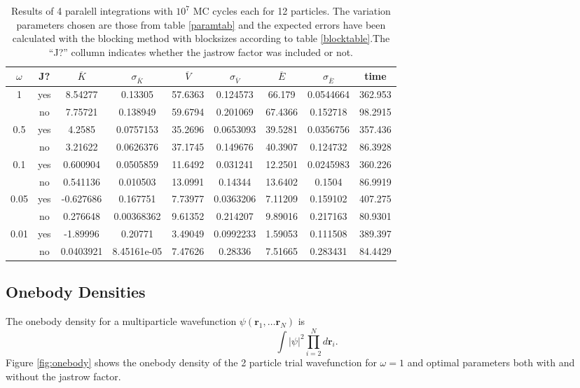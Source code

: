 \documentclass[a4paper,English,10pt]{article}
\newcommand{\bb}[1]{\boldsymbol{#1}}
\newcommand{\be}{\begin{equation}}
\newcommand{\ee}{\end{equation}}
\renewcommand{\bar}{\overline}
\begin{document}
\begin{table}
  \centering
    \caption[Results 12 particles]{Results of 4 paralell integrations with $10^7$ MC cycles each for 12 particles.
    The variation parameters chosen are those from table \ref{paramtab} and the expected errors have been calculated with the blocking method with blocksizes
    according to table \ref{blocktable}.The ``J?'' collumn indicates whether the jastrow factor was included or not.}
  \label{Etab12}
  \begin{tabular}{*{9}c}
    \toprule
     $\omega$ &J?& $\bar{K}$ & $\sigma_{\bar{K}}$& $\bar{V}$& $\sigma_{\bar{V}}$& $\bar{E}$  & $\sigma_{\bar{E}}$  &time\\
    \midrule
    1 &yes&8.54277&	0.13305	&57.6363	&0.124573&	66.179&	0.0544664 & 362.953\\
    &no &7.75721	&0.138949	&59.6794	&0.201069	&67.4366	&0.152718 &98.2915\\
    0.5 &yes&4.2585	&0.0757153	&35.2696	&0.0653093	&39.5281	&0.0356756 &357.436\\
    &no &3.21622	&0.0626376	&37.1745	&0.149676	&40.3907	&0.124732 &86.3928\\
    0.1&yes &0.600904	&0.0505859	&11.6492	&0.031241	&12.2501	&0.0245983 &360.226\\
    & no &0.541136	&0.010503	&13.0991	&0.14344	&13.6402	&0.1504 &86.9919 \\
    0.05&yes &-0.627686	&0.167751	&7.73977	&0.0363206	&7.11209	&0.159102  &407.275\\
    &no&0.276648	&0.00368362	&9.61352	&0.214207	&9.89016	&0.217163 &80.9301\\
    0.01&yes &-1.89996	&0.20771	&3.49049	&0.0992233	&1.59053	&0.111508 &389.397\\
    &no&0.0403921	&8.45161e-05	&7.47626	&0.28336	&7.51665	&0.283431 &84.4429\\
    \bottomrule
  \end{tabular}
\end{table}

\subsection{Onebody Densities}

The onebody density for a multiparticle wavefunction $\psi(\bb{r}_1,\ldots\bb{r}_N)$ is
\be
\int |\psi|^2\prod_{i = 2}^Nd\bb{r}_i\label{onebodyeq}.
\ee
Figure \ref{fig:onebody} shows the onebody density of the 2 particle trial wavefunction for $\omega = 1$ and optimal parameters both with and without the jastrow factor.
\end{document}
